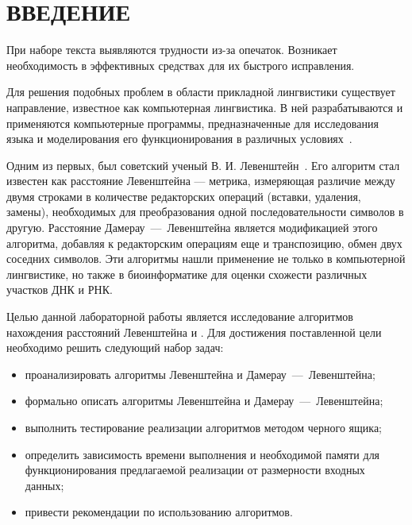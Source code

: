 \part*{ВВЕДЕНИЕ}

При наборе текста выявляются трудности из-за опечаток. Возникает необходимость в эффективных средствах для их быстрого исправления.

Для решения подобных проблем в области прикладной лингвистики существует направление, известное как компьютерная лингвистика. В ней разрабатываются и применяются компьютерные программы, предназначенные для исследования языка и моделирования его функционирования в различных условиях~\cite{big_comp_lingua}.

Одним из первых, был советский ученый В. И. Левенштейн~\cite{levenstein}. Его алгоритм стал известен как расстояние Левенштейна — метрика, измеряющая различие между двумя строками в количестве редакторских операций (вставки, удаления, замены), необходимых для преобразования одной последовательности символов в другую. Расстояние Дамерау~---~Левенштейна является модификацией этого алгоритма, добавляя к редакторским операциям еще и транспозицию, обмен двух соседних символов. Эти алгоритмы нашли применение не только в компьютерной лингвистике, но также в биоинформатике для оценки схожести различных участков ДНК и РНК.

Целью данной лабораторной работы является исследование алгоритмов нахождения расстояний Левенштейна и . Для достижения поставленной цели необходимо решить следующий набор задач:

\begin{itemize}
	\item проанализировать алгоритмы Левенштейна и Дамерау~---~Левенштейна;
	\item формально описать алгоритмы Левенштейна и Дамерау~---~Левенштейна;
	\item выполнить тестирование реализации алгоритмов методом черного ящика;
	\item определить зависимость времени выполнения и необходимой памяти для функционирования предлагаемой реализации от размерности входных данных;
	\item привести рекомендации по использованию алгоритмов.
\end{itemize}